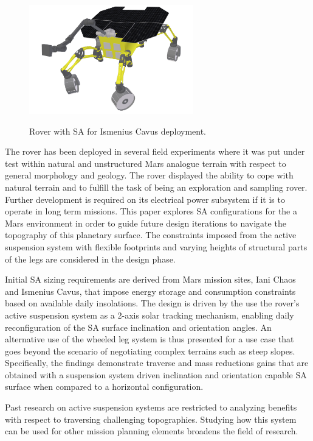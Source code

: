 \documentclass[twocolumn,letterpaper]{IEEEAerospaceCLS}  %
\begin{document}
\begin{figure}[h]
 \centering
 \includegraphics[width=2.8in]{figures/images/ismenius-cavus-10deg-pitch.png}\\
 \caption{Rover with \ac{SA} for Ismenius Cavus deployment.}
 \label{fig:solar-array-on-ismenius-cavus-chaos}
\end{figure}

The rover has been deployed in several field experiments where it was put under test within natural and unstructured Mars analogue terrain with respect to general morphology and geology. The rover displayed the ability to cope with natural terrain and to fulfill the task of being an exploration and sampling rover. Further development is required on its electrical power subsystem if it is to operate in long term missions. This paper explores \ac{SA} configurations for the a Mars environment in order to guide future design iterations to navigate the topography of this planetary surface. The constraints imposed from the active suspension system with flexible footprints and varying heights of structural parts of the legs are considered in the design phase.

Initial \ac{SA} sizing requirements are derived from Mars mission sites, Iani Chaos and Ismenius Cavus, that impose energy storage and consumption constraints based on available daily insolations. The design is driven by the use the rover's active suspension system as a 2-axis solar tracking mechanism, enabling daily reconfiguration of the \ac{SA} surface inclination and orientation angles. An alternative use of the wheeled leg system is thus presented for a use case that goes beyond the scenario of negotiating complex terrains such as steep slopes. Specifically, the findings demonstrate traverse and mass reductions gains that are obtained with a suspension system driven inclination and orientation capable \ac{SA} surface when compared to a horizontal configuration.

Past research on active suspension systems are restricted to analyzing benefits with respect to traversing challenging topographies. Studying how this system can be used for other mission planning elements broadens the field of research.
\end{document}
